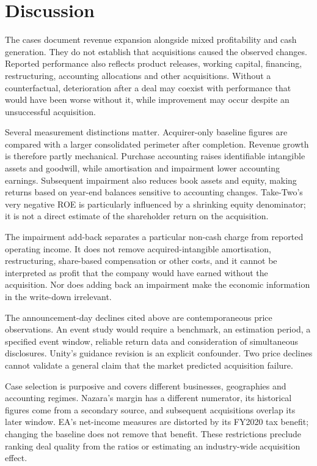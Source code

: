 \documentclass[11pt]{article}
\begin{document}
\section{Discussion}\label{sec:discussion}

The cases document revenue expansion alongside mixed profitability and cash generation. They do not establish that acquisitions caused the observed changes. Reported performance also reflects product releases, working capital, financing, restructuring, accounting allocations and other acquisitions. Without a counterfactual, deterioration after a deal may coexist with performance that would have been worse without it, while improvement may occur despite an unsuccessful acquisition.

Several measurement distinctions matter. Acquirer-only baseline figures are compared with a larger consolidated perimeter after completion. Revenue growth is therefore partly mechanical. Purchase accounting raises identifiable intangible assets and goodwill, while amortisation and impairment lower accounting earnings. Subsequent impairment also reduces book assets and equity, making returns based on year-end balances sensitive to accounting changes. Take-Two's very negative ROE is particularly influenced by a shrinking equity denominator; it is not a direct estimate of the shareholder return on the acquisition.

The impairment add-back separates a particular non-cash charge from reported operating income. It does not remove acquired-intangible amortisation, restructuring, share-based compensation or other costs, and it cannot be interpreted as profit that the company would have earned without the acquisition. Nor does adding back an impairment make the economic information in the write-down irrelevant.

The announcement-day declines cited above are contemporaneous price observations. An event study would require a benchmark, an estimation period, a specified event window, reliable return data and consideration of simultaneous disclosures. Unity's guidance revision is an explicit confounder. Two price declines cannot validate a general claim that the market predicted acquisition failure.

Case selection is purposive and covers different businesses, geographies and accounting regimes. Nazara's margin has a different numerator, its historical figures come from a secondary source, and subsequent acquisitions overlap its later window. EA's net-income measures are distorted by its FY2020 tax benefit; changing the baseline does not remove that benefit. These restrictions preclude ranking deal quality from the ratios or estimating an industry-wide acquisition effect.
\end{document}
